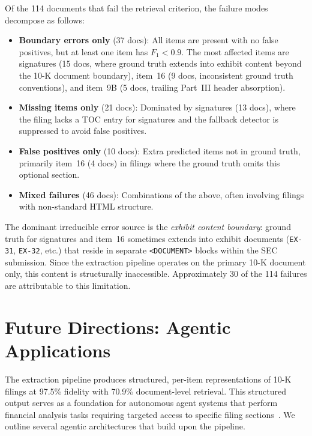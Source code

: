 \documentclass[12pt,letterpaper,oneside]{article}
\begin{document}
Of the 114 documents that fail the retrieval criterion, the failure
modes decompose as follows:

\begin{itemize}
  \item \textbf{Boundary errors only} (37 docs): All items are
    present with no false positives, but at least one item has
    $F_1 < 0.9$. The most affected items are signatures (15 docs,
    where ground truth extends into exhibit content beyond the
    10-K document boundary), item~16 (9 docs, inconsistent ground
    truth conventions), and item~9B (5 docs, trailing Part~III
    header absorption).

  \item \textbf{Missing items only} (21 docs): Dominated by
    signatures (13 docs), where the filing lacks a TOC entry for
    signatures and the fallback detector is suppressed to avoid
    false positives.

  \item \textbf{False positives only} (10 docs): Extra predicted
    items not in ground truth, primarily item~16 (4 docs) in
    filings where the ground truth omits this optional section.

  \item \textbf{Mixed failures} (46 docs): Combinations of the
    above, often involving filings with non-standard HTML structure.
\end{itemize}

\noindent The dominant irreducible error source is the \emph{exhibit
content boundary}: ground truth for signatures and item~16 sometimes
extends into exhibit documents (\texttt{EX-31}, \texttt{EX-32}, etc.)
that reside in separate \texttt{<DOCUMENT>} blocks within the SEC
submission. Since the extraction pipeline operates on the primary
10-K document only, this content is structurally inaccessible.
Approximately 30 of the 114 failures are attributable to this
limitation.


\section{Future Directions: Agentic Applications}\label{sec:future}

The extraction pipeline produces structured, per-item representations
of 10-K filings at 97.5\% fidelity with 70.9\% document-level
retrieval. This structured output serves as a foundation for
autonomous agent systems that perform financial analysis tasks
requiring targeted access to specific filing
sections~\cite{zhang2023form10k}. We outline several agentic
architectures that build upon the pipeline.
\end{document}
